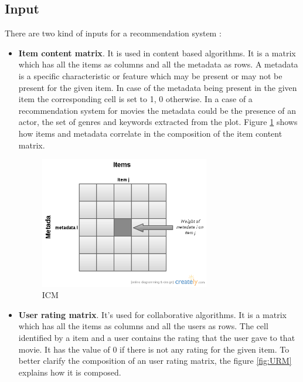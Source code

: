 \subsection{Input}
\label{sec:Input}

There are two kind of inputs for a recommendation system \cite{thesis-andreia}:

\begin{itemize}
\item \textbf{Item content matrix}. It is used in content based algorithms. It is a matrix which has all the items as columns and all the metadata as rows. A metadata is a specific characteristic or feature which may be present or may not be present for the given item. In case of the metadata being present in the given item the corresponding cell is set to 1, 0 otherwise. In a case of a recommendation system for movies the metadata could be the presence of an actor, the set of genres and keywords extracted from the plot. Figure \ref{fig:ICM} shows how items and metadata correlate in the composition of the item content matrix.

  \begin{figure}
    \centering
    \includegraphics[width=0.7\textwidth]{figures/ICM.png}
    \caption{ICM}
    \label{fig:ICM}
  \end{figure}
 
\item \textbf{User rating matrix}. It's used for collaborative algorithms. It is a matrix which has all the items as columns and all the users as rows. The cell identified by a item and a user contains the rating that the user gave to that movie. It has the value of 0 if there is not any rating for the given item. To better clarify the composition of an user rating matrix, the figure \ref{fig:URM} explains how it is composed.


\end{itemize}

